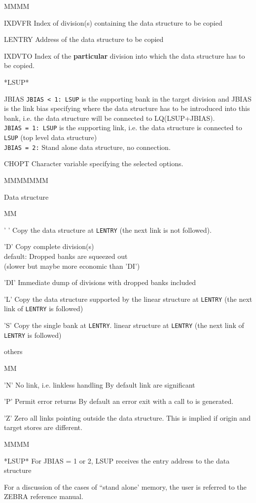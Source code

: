 \begin{DL}{MMMM}
\item[IXDVFR]Index of division(s) containing the data structure to be copied
\item[LENTRY]Address of the data structure to be copied
\item[IXDVTO]Index of the {\bf particular}
division into which the data structure has to be copied.
\item[*LSUP*]
\item[JBIAS]{\tt JBIAS < 1: LSUP} is the supporting bank in the target division
and JBIAS is the link bias specifying where the data structure has to be
introduced into this bank, i.e. the data structure will be connected
to LQ(LSUP+JBIAS).\\
{\tt JBIAS = 1: LSUP} is the supporting link, i.e. the data structure
is connected to {\tt LSUP} (top level data structure)\\
{\tt JBIAS = 2:} Stand alone data structure, no connection.
\item[CHOPT]Character variable specifying the selected options.
\begin{DL}{MMMMMMM}
\item[Data structure]
\begin{DL}{MM}
\item[' ']Copy the data structure at {\tt LENTRY} (the next link is not
followed).
\item['D']Copy complete division(s)\\
default: Dropped banks are squeezed out\\
\phantom{default:} (slower but maybe more economic than 'DI')
\item['DI']Immediate dump of divisions with dropped banks included
\item['L']Copy the data structure supported by the
linear structure at {\tt LENTRY} (the next link of {\tt LENTRY} is followed)
\item['S']Copy the single bank at {\tt LENTRY}.
linear structure at {\tt LENTRY} (the next link of {\tt LENTRY} is followed)
\end{DL}
\item[others]
\begin{DL}{MM}
\item['N']No link, i.e. linkless handling
By default link are significant
\item['P']Permit error returns
By default an error exit with a call to  is generated.
\item['Z']Zero all links pointing outside the data structure.
This is implied if origin and target stores are different.
\end{DL}
\end{DL}
\end{DL}
\Odesc
\begin{DL}{MMMM}
\item[*LSUP*]For JBIAS = 1 or 2, LSUP receives
the entry address to the data structure
\end{DL}
\par For a discussion of the cases of ``stand alone' memory, the user is
referred to the ZEBRA reference manual.

